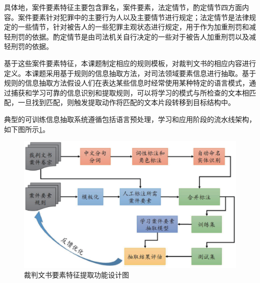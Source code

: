 


具体地，案件要素特征主要包含罪名，案件要素，法定情节，酌定情节四方面内容。案件要素针对犯罪中的主要行为人以及主要情节进行规定；法定情节是法律规定的一些情节，针对被告人的一些犯罪主观状态进行规定，用于作为加重刑罚和减轻刑罚的依据。酌定情节是由司法机关自行决定的一些对于被告人加重刑罚以及减轻刑罚的依据。

基于这些案件要素特征，本课题制定相应的规则模板，对裁判文书的相应内容进行定义。本课题采用基于规则的信息抽取方法，对司法领域要素信息进行抽取。基于规则的信息抽取方法假设人们在表达某些信息时经常使用某种特定的语言模式，通过捕获和学习可靠的信息识别和提取规则，可以将学习的模式与所检查的文本相匹配，一旦找到匹配，则触发提取动作将匹配的文本片段转移到目标结构中。

典型的可训练信息抽取系统遵循包括语言预处理，学习和应用阶段的流水线架构，如下图所示\ref{fig:sys_element_tech}。

\begin{figure}[htbp]%
    \centering
    \includegraphics[scale=0.5, clip=true]{./sources/sys_element_tech.eps}
    \caption{\label{fig:sys_element_tech}裁判文书要素特征提取功能设计图}
\end{figure}


